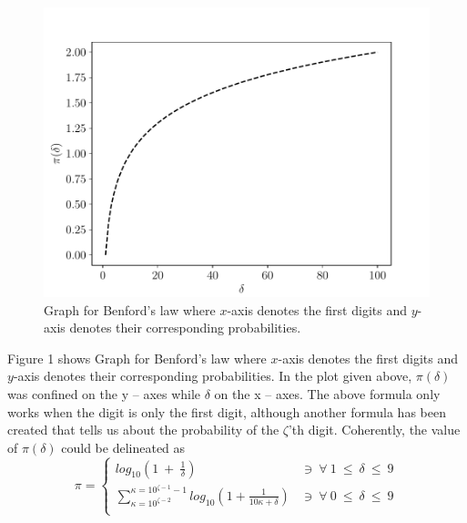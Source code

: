 \documentclass[conference]{IEEEtran}
\begin{document}
\begin{figure}[htbp]
\centerline{\includegraphics[width = \linewidth]{1}}
\label{fig1}
\caption{Graph for Benford’s law where $x$-axis denotes the first digits and $y$-axis denotes their corresponding probabilities.}
\end{figure}
Figure 1 shows Graph for Benford’s law where $x$-axis denotes the first digits and $y$-axis denotes their corresponding probabilities. In the plot given above, $\pi(\delta)$ was confined on the y – axes while $\delta$ on the x – axes. The above formula only works when the digit is only  the first digit, although another formula has been created that tells us about the probability of the $\zeta$’th digit. Coherently, the value of $\pi\left(\delta\right)$ could be delineated as
\begin{equation*}
\pi=\left\{\begin{matrix}{log}_{10}{\left(1\ +\ \frac{1}{\delta}\right)}&\ni\ \forall\ 1\ \le\ \delta\ \le\ 9\\\sum_{\kappa={10}^{\zeta-2}}^{\kappa={10}^{\zeta-1}-1}{log}_{10}{\left(1+\frac{1}{10\kappa+\delta}\right)}&\ni\ \forall\ 0\ \le\ \delta\ \le\ 9\\\end{matrix}\right.
\end{equation*}
\end{document}
